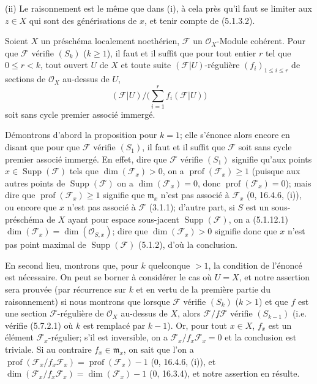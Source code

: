
(ii) Le raisonnement est le même que dans (i), à cela près qu'il faut se
limiter aux $z\in X$ qui sont des générisations de $x$, et tenir compte de
(5.1.3.2).

\begin{proposition}[5.7.5]
\label{IV.2.s5.7.5-fr}
Soient $X$ un préschéma localement noethérien, $\mathscr F$ un
$\mathcal O_X$-Module cohérent. Pour que $\mathscr F$ vérifie $(S_k)$
($k\geq1$), il faut et il suffit que pour tout entier $r$ tel que
$0\leq r<k$, tout ouvert $U$ de $X$ et toute suite
$(\mathscr F|U)$-régulière $(f_i)_{1\leq i\leq r}$ de sections de
$\mathcal O_X$ au-dessus de $U$,
\[
(\mathscr F|U)\big/\Big(\sum_{i=1}^r f_i(\mathscr F|U)\Big)
\]
soit sans cycle premier associé immergé.
\end{proposition}

Démontrons d'abord la proposition pour $k=1$; elle s'énonce alors encore en
disant que pour que $\mathscr F$ vérifie $(S_1)$, il faut et il suffit que
$\mathscr F$ soit sans cycle premier associé immergé. En effet, dire que
$\mathscr F$ vérifie $(S_1)$ signifie qu'aux points
$x\in\operatorname{Supp}(\mathscr F)$ tels que $\dim(\mathscr F_x)>0$, on a
$\operatorname{prof}(\mathscr F_x)\geq1$ (puisque aux autres points de
$\operatorname{Supp}(\mathscr F)$ on a $\dim(\mathscr F_x)=0$, donc
$\operatorname{prof}(\mathscr F_x)=0$); mais dire que
$\operatorname{prof}(\mathscr F_x)\geq1$ signifie que $\mathfrak m_x$
n'est pas associé à $\mathscr F_x$ (0, 16.4.6, (i)), ou encore que $x$
n'est pas associé à $\mathscr F$ (3.1.1); d'autre part, si $S$ est un
sous-préschéma de $X$ ayant pour espace sous-jacent
$\operatorname{Supp}(\mathscr F)$, on a (5.1.12.1)
$\dim(\mathscr F_x)=\dim(\mathcal O_{S,x})$; dire que
$\dim(\mathscr F_x)>0$ signifie donc que $x$ n'est pas point maximal de
$\operatorname{Supp}(\mathscr F)$ (5.1.2), d'où la conclusion.

En second lieu, montrons que, pour $k$ quelconque $>1$, la condition de
l'énoncé est nécessaire. On peut se borner à considérer le cas où $U=X$,
et notre assertion sera prouvée (par récurrence sur $k$ et en vertu de la
première partie du raisonnement) si nous montrons que lorsque $\mathscr F$
vérifie $(S_k)$ ($k>1$) et que $f$ est une section $\mathscr F$-régulière
de $\mathcal O_X$ au-dessus de $X$, alors $\mathscr F/f\mathscr F$ vérifie
$(S_{k-1})$ (i.e. vérifie (5.7.2.1) où $k$ est remplacé par $k-1$). Or,
pour tout $x\in X$, $f_x$ est un élément $\mathscr F_x$-régulier; s'il est
inversible, on a $\mathscr F_x/f_x\mathscr F_x=0$ et la conclusion est
triviale. Si au contraire $f_x\in\mathfrak m_x$, on sait que l'on a
$\operatorname{prof}(\mathscr F_x/f_x\mathscr F_x)
=\operatorname{prof}(\mathscr F_x)-1$ (0, 16.4.6, (i)), et
$\dim(\mathscr F_x/f_x\mathscr F_x)=\dim(\mathscr F_x)-1$ (0, 16.3.4), et
notre assertion en résulte.

